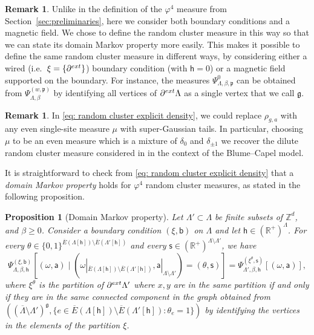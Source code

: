 \documentclass[11pt,a4paper]{article}
\newtheorem{proposition}[theorem]{Proposition}
\theoremstyle{definition}
\newtheorem{remark}[theorem]{Remark}
\numberwithin{equation}{section}
\newcommand\fg{\mathfrak{g}}
\begin{document}
\begin{remark}
Unlike in the definition of the $\varphi^4$ measure from Section~\textup{\ref{sec:preliminaries}}, here we consider both boundary conditions and a magnetic field. We chose to define the random cluster measure in this way so that we can state its domain Markov property more easily. This makes it possible to define the same random cluster measure in different ways, by considering either a wired (i.e.~$\xi=\{\partial^{\rm ext}\}$) boundary condition (with $\mathsf{h}=0$) or a magnetic field supported on the boundary.  For instance, the measures $\Psi_{\Lambda,\beta,\mathfrak{p}}^{0}$ can be obtained from $\Psi_{\Lambda,\beta}^{(w,\mathfrak{p})}$ by identifying all vertices of $\partial^{\rm ext}\Lambda$ as a single vertex that we call $\fg$. 
\end{remark}

\begin{remark}
In \eqref{eq: random cluster explicit density}, we could replace $\rho_{g,a}$ with any even single-site measure $\mu$ with super-Gaussian tails. In particular, choosing $\mu$ to be an even measure which is a mixture of $\delta_0$ and $\delta_{\pm 1}$ we recover the dilute random cluster measure considered in \textup{\cite{Graham2006random, gunaratnam2024blume}} in the context of the Blume--Capel model.
\end{remark}

It is straightforward to check from \eqref{eq: random cluster explicit density} that a \emph{domain Markov property} holds for $\varphi^4$ random cluster measures, as stated in the following proposition.

\begin{proposition}[Domain Markov property]\label{prop: domain markov}
Let $\Lambda'\subset \Lambda$ be finite subsets of $\mathbb Z^d$, and $\beta\geq 0$. Consider a boundary condition $(\xi,\mathsf{b})$ on $\Lambda$ and let $\mathsf h\in (\mathbb{R}^+)^{\Lambda}$. For every $\theta\in \{0,1\}^{\overline E(\Lambda[\mathsf{h}]) \setminus \overline E(\Lambda'[\mathsf{h}])}$ and every $\mathsf{s}\in (\mathbb{R}^+)^{\Lambda\setminus \Lambda'}$, we have
\begin{equation}
\Psi^{(\xi,\mathsf{b})}_{\Lambda,\beta,\mathsf{h}}[(\omega,\mathsf{a}) \mid (\omega|_{\overline E(\Lambda[\mathsf{h}])\setminus \overline E(\Lambda'[\mathsf{h}])},\mathsf{a}|_{\Lambda\setminus \Lambda'})=(\theta,\mathsf{s})]=\Psi^{(\xi^{\theta},\mathsf{s})}_{\Lambda',\beta,\mathsf{h}}[(\omega,\mathsf{a})],
\end{equation}
where $\xi^{\theta}$ is the partition of $\partial^{\rm ext} \Lambda'$ where $x,y$ are in the same partition if and only if they are in the same connected component in the graph obtained from  $((\overline{\Lambda}\setminus \Lambda')^{\mathfrak g}, \{ e \in \overline E(\Lambda[\mathsf h])\setminus \overline E(\Lambda'[\mathsf h]):\theta_e=1\})$ by identifying the vertices in the elements of the partition $\xi$.
\end{proposition}
\end{document}
